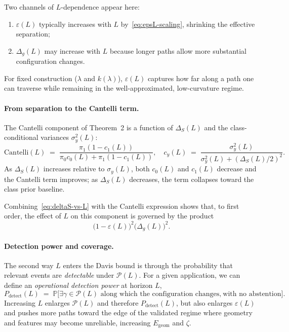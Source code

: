 \documentclass[11pt]{article}
\theoremstyle{remark}
\theoremstyle{plain}
\begin{document}
Two channels of $L$-dependence appear here:
\begin{enumerate}[label=(\alph*), leftmargin=*]
  \item $\varepsilon(L)$ typically increases with $L$ by~\eqref{eq:epsL-scaling}, shrinking the effective separation;
  \item $\Delta_g(L)$ may increase with $L$ because longer paths allow more substantial configuration changes.
\end{enumerate}
For fixed construction ($\lambda$ and $k(\lambda)$), $\varepsilon(L)$ captures how far along a path one
can traverse while remaining in the well-approximated, low-curvature regime.

\paragraph{From separation to the Cantelli term.}
The Cantelli component of Theorem~2 is a function of $\Delta_S(L)$ and the class-conditional
variances $\sigma_y^2(L)$:
\[
\mathrm{Cantelli}(L)
\;=\;
\frac{\pi_1 (1-c_1(L))}{\pi_0 c_0(L) + \pi_1 (1-c_1(L))},
\quad
c_y(L) \;=\; \frac{\sigma_y^2(L)}{\sigma_y^2(L) + (\Delta_S(L)/2)^2}.
\]
As $\Delta_S(L)$ increases relative to $\sigma_y(L)$, both $c_0(L)$ and $c_1(L)$ decrease and the
Cantelli term improves; as $\Delta_S(L)$ decreases, the term collapses toward the class prior
baseline.

Combining~\eqref{eq:deltaS-vs-L} with the Cantelli expression shows that,
to first order, the effect of $L$ on this component is governed by the product
\[
\bigl(1 - \varepsilon(L)\bigr)^2 \bigl(\Delta_g(L)\bigr)^2.
\]

\paragraph{Detection power and coverage.}
The second way $L$ enters the Davis bound is through the probability that relevant events are
\emph{detectable} under $\mathcal{P}(L)$. For a given application, we can define an
\emph{operational detection power} at horizon $L$,
\[
P_{\mathrm{detect}}(L)
\;=\;
\mathbb{P}\bigl[ \exists \gamma \in \mathcal{P}(L)
  \text{ along which the configuration changes,}\ \text{with no abstention} \bigr].
\]
Increasing $L$ enlarges $\mathcal{P}(L)$ and therefore $P_{\mathrm{detect}}(L)$, but also enlarges
$\varepsilon(L)$ and pushes more paths toward the edge of the validated regime where geometry
and features may become unreliable, increasing $E_{\mathrm{geom}}$ and $\zeta$.
\end{document}
